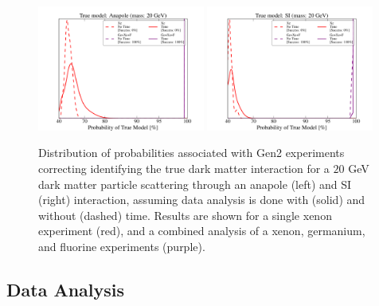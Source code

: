 \documentclass[11pt]{article}
\begin{document}
 

\begin{figure}
\centering
\includegraphics[width=0.49\textwidth, trim=1.cm 0.0cm 1.cm 0.4cm,clip=true]{plots/PDF_Single_20GeV_Anapole_50sims_Xe_vs_FGeXe_GF_TNT.pdf}
\includegraphics[width=0.49\textwidth, trim=1.cm 0.0cm 1.cm 0.4cm,clip=true]{plots/PDF_Single_20GeV_SI_Higgs_50sims_Xe_vs_FGeXe_GF_TNT.pdf}
\caption{\label{fig:20gev_anapole_Xe_v_All_TNT_GF}
Distribution of probabilities associated with Gen2 experiments correcting identifying the true dark matter interaction for a $20$ GeV dark matter particle scattering through an anapole (left) and SI (right) interaction, assuming data analysis is done with (solid) and without (dashed) time. Results are shown for a single xenon experiment (red), and a combined analysis of a xenon, germanium, and fluorine experiments (purple).}
\end{figure}



\subsection{Data Analysis}
\end{document}
